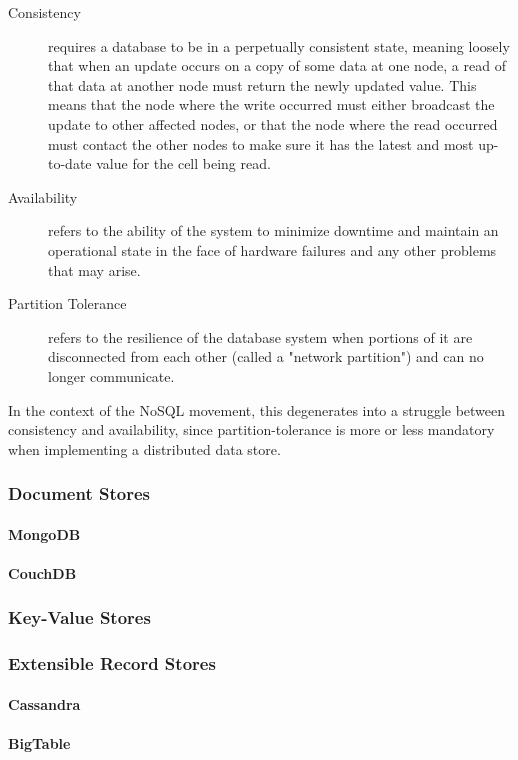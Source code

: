 \documentclass[11pt,a4paper]{report}
\begin{document}
\begin{description}
\item[Consistency] 
requires a database to be in a perpetually consistent state, meaning loosely that when an update occurs on a copy of some data at one node, a read of that data at another node must return the newly updated value. This means that the node where the write occurred must either broadcast the update to other affected nodes, or that the node where the read occurred must contact the other nodes to make sure it has the latest and most up-to-date value for the cell being read.
\item[Availability] refers to the ability of the system to minimize downtime and maintain an operational state in the face of hardware failures and any other problems that may arise.
\item[Partition Tolerance] refers to the resilience of the database system when portions of it are disconnected from each other (called a "network partition") and can no longer communicate.
\end{description}

In the context of the NoSQL movement, this degenerates into a struggle between consistency and availability, since partition-tolerance is more or less mandatory when implementing a distributed data store.

\subsubsection*{Document Stores}
\paragraph*{MongoDB}
\paragraph*{CouchDB}
\subsubsection*{Key-Value Stores}
\subsubsection*{Extensible Record Stores}
\paragraph*{Cassandra}
\paragraph*{BigTable}
\end{document}
